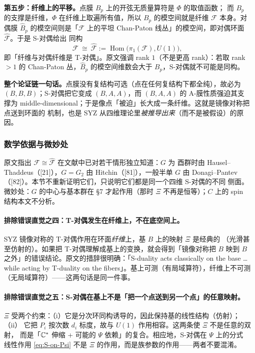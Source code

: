 \textbf{第五步：纤维上的平移。}点膜 $B_p$ 上的开弦无质量算符是 $\Phi$ 的取值函数；
而 $B_p$ 的支撑是纤维，$\Phi$ 在纤维上取遍所有值，所以 $B_p$ 的模空间就是纤维
$\mathcal F$ 本身。对偶膜 $\widehat B_p$ 的模空间则是「$\mathcal F$ 上的平坦
Chan-Paton 线丛」的模空间，即对偶环面 $\widehat{\mathcal F}$。于是 S-对偶给出
同构
\begin{equation}
\mathcal F\ \cong\ \widehat{\mathcal F}:=\operatorname{Hom}\bigl(\pi_1(\mathcal F),U(1)\bigr),
\label{eq:SYZ-fiber}
\end{equation}
即「纤维与对偶纤维是 T-对偶」。原文强调 rank $1$（不是更高 rank）：若取 rank $>1$
的 Chan-Paton 丛，$\widehat B_p$ 的模空间维数会大于 $B_p$，S-对偶就不可能是同构。
\pA{}

\begin{keyidea}
\textbf{整个论证链一句话。}点膜没有复结构可选（点在任何复结构下都全纯），故必为
$(B,B,B)$；S-对偶把它变成 $(B,A,A)$，而 $(B,A,A)$ 的 A-膜性质强迫其支撑为
middle-dimensional；于是像点「被迫」长大成一条纤维。这就是镜像对称把点送到环面的
机制，也是 SYZ 从四维理论里\emph{被推导出来}（而不是被假设）的原因。
\end{keyidea}

\subsubsection*{数学依据与微妙处}

原文指出 $\mathcal F\cong\widehat{\mathcal F}$ 在文献中已对若干情形独立知道：$G$ 为
酉群时由 Hausel--Thaddeus（[21]），$G=G_2$ 由 Hitchin（[81]），一般半单 $G$ 由
Donagi--Pantev（[82]）。本节不重新证明它们，只说明它们都是同一个四维 S-对偶的不同
侧面。微妙处：$G$ 的中心与基本群在 §7 才起作用（那时 $\Xi$ 不再是恒等）；$C$ 上的
spin 结构本文不分析。\pA{}


\paragraph{排除错误直觉之四：T-对偶发生在纤维上，不在底空间上。}
SYZ 镜像对称的 T-对偶作用在环面\emph{纤维}上，基 $B$ 上的映射 $\Xi$ 是经典的
（光滑甚至仿射的）。如果把 T-对偶理解成基上的变换，就会得到「镜像对称把 $B$ 映到
$B$ 之外」的错误结论。原文的措辞很明确：「S-duality acts classically on the base …
while acting by T-duality on the fibers」。基上可测（有局域算符），纤维上不可测
（无局域算符）——这两句话是同一件事。\pA{}

\paragraph{排除错误直觉之五：S-对偶在基上不是「把一个点送到另一个点」的任意映射。}
$\Xi$ 受两个约束：（i）它是分次环同构诱导的，因此保持基的线性结构（仿射）；（ii）
它把 $P_i$ 按次数 $d_i$ 标度，故与 $U(1)$ 作用相容。这两条使 $\Xi$ 不是任意的双射，
而是「$\mathbb{C}^*$ 伸缩 + 可能的 $\Psi$ 依赖」的复合。相应地，S-对偶在 $\Psi$ 上的分式
线性作用 \eqref{eq:S-on-Psi} 不是 $\Xi$ 的作用，而是族参数的作用——两者不要混淆。
\pB{}

